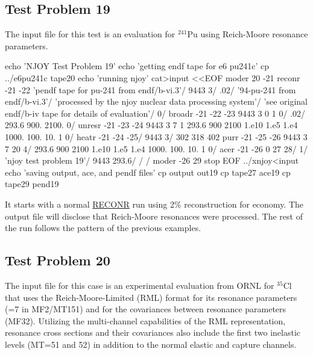 \subsection{Test Problem 19}
\label{ssMandT_19}

The input file for this test is an evaluation for $^{241}$Pu using
Reich-Moore resonance parameters.

\small
\begin{ccode}

echo 'NJOY Test Problem 19'
echo 'getting endf tape for e6 pu241c'
cp ../e6pu241c tape20
echo 'running njoy'
cat>input <<EOF
 moder
 20 -21
 reconr
 -21 -22
 'pendf tape for pu-241 from endf/b-vi.3'/
 9443 3/
 .02/
 '94-pu-241 from endf/b-vi.3'/
 'processed by the njoy nuclear data processing system'/
 'see original endf/b-iv tape for details of evaluation'/
 0/
 broadr
 -21 -22 -23
 9443 3 0 1 0/
 .02/
 293.6 900. 2100.
 0/
 unresr
 -21 -23 -24
 9443 3 7 1
 293.6 900 2100
 1.e10 1.e5 1.e4 1000. 100. 10. 1
 0/
 heatr
 -21 -24 -25/
 9443 3/
 302 318 402
 purr
 -21 -25 -26
 9443 3 7 20 4/
 293.6 900 2100
 1.e10 1.e5 1.e4 1000. 100. 10. 1
 0/
 acer
 -21 -26 0 27 28/
 1/
 'njoy test problem 19'/
 9443 293.6/
 /
 /
 moder
 -26 29
 stop
EOF
../xnjoy<input
echo 'saving output, ace, and pendf files'
cp output out19
cp tape27 ace19
cp tape29 pend19

\end{ccode}
\normalsize

It starts with a normal \hyperlink{sRECONRhy}{RECONR} run
using 2\% reconstruction for economy.  The output file will
disclose that Reich-Moore resonances were processed.  The
rest of the run follows the pattern of the previous examples.

\subsection{Test Problem 20}
\label{ssMandT_20}

The input file for this case is an experimental evaluation
from ORNL for $^{35}$Cl
that uses the Reich-Moore-Limited
(RML) format for its resonance parameters (=7 in
MF2/MT151) and for the covariances between resonance
parameters (MF32).  Utilizing the multi-channel capabilities
of the RML representation, resonance cross sections and
their covariances also include the first two inelastic levels
(MT=51 and 52) in addition to the normal elastic and capture
channels.

